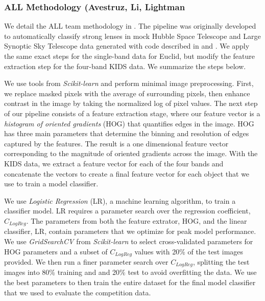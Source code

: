 \documentclass[useAMS,usenatbib]{mnras}
\begin{document}
\subsubsection{ALL Methodology (Avestruz, Li, Lightman}

We detail the ALL team methodology in \citet{avestruz_etal17}. The
pipeline was originally developed to automatically classify strong
lenses in mock Hubble Space Telescope and Large Synoptic Sky Telescope
data generated with code described in \citet{li_etal16} and
\citet{collett_15}.  We apply the same exact steps for the single-band
data for Euclid, but modify the feature extraction step for the
four-band KIDS data.  We summarize the steps below.

We use tools from {\em Scikit-learn} \citep{pedregosa_etal12} and
perform minimal image preprocessing. First, we replace masked pixels
with the average of surrounding pixels, then enhance contrast in the
image by taking the normalized log of pixel values.  The next step of
our pipeline consists of a feature extraction stage, where our feature
vector is a {\em histogram of oriented gradients} (HOG)
\citep{dalalandtriggs_05} that quantifies edges in the image.  HOG has
three main parameters that determine the binning and resolution of
edges captured by the features.  The result is a one dimensional
feature vector corresponding to the magnitude of oriented gradients
across the image.  With the KIDS data, we extract a feature vector for
each of the four bands and concatenate the vectors to create a final
feature vector for each object that we use to train a model
classifier.

We use {\em Logistic Regression} (LR), a machine learning algorithm,
to train a classifier model.  LR requires a parameter search over the
regression coefficient, $C_{LogReg}$.  The parameters from both the
feature extrator, HOG, and the linear classifier, LR, contain
parameters that we optimize for peak model performance.  We use {\em
  GridSearchCV} from {\em Scikit-learn} to select cross-validated
parameters for HOG parameters and a subset of $C_{LogReg}$ values with
20\% of the test images provided.  We then run a finer parameter
search over $C_{LogReg}$, splitting the test images into 80\% training
and and 20\% test to avoid overfitting the data.  We use the best
parameters to then train the entire dataset for the final model
classifier that we used to evaluate the competition data.
\end{document}
